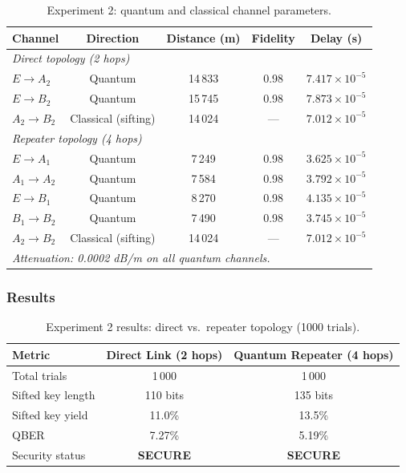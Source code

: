 \documentclass[12pt,oneside,letterpaper,english]{article}
\begin{document}
\begin{table}[h!]
\centering
\caption{Experiment 2: quantum and classical channel parameters.}
\label{tab:exp2_channels}
\begin{tabular}{lcccc}
\toprule
\textbf{Channel} & \textbf{Direction} & \textbf{Distance (m)} & \textbf{Fidelity} & \textbf{Delay (s)} \\
\midrule
\multicolumn{5}{l}{\textit{Direct topology (2 hops)}} \\
\midrule
$E \to A_2$ & Quantum & 14\,833 & 0.98 & $7.417 \times 10^{-5}$ \\
$E \to B_2$ & Quantum & 15\,745 & 0.98 & $7.873 \times 10^{-5}$ \\
$A_2 \to B_2$ & Classical (sifting) & 14\,024 & --- & $7.012 \times 10^{-5}$ \\
\midrule
\multicolumn{5}{l}{\textit{Repeater topology (4 hops)}} \\
\midrule
$E \to A_1$ & Quantum & 7\,249 & 0.98 & $3.625 \times 10^{-5}$ \\
$A_1 \to A_2$ & Quantum & 7\,584 & 0.98 & $3.792 \times 10^{-5}$ \\
$E \to B_1$ & Quantum & 8\,270 & 0.98 & $4.135 \times 10^{-5}$ \\
$B_1 \to B_2$ & Quantum & 7\,490 & 0.98 & $3.745 \times 10^{-5}$ \\
$A_2 \to B_2$ & Classical (sifting) & 14\,024 & --- & $7.012 \times 10^{-5}$ \\
\midrule
\multicolumn{5}{l}{\textit{Attenuation: 0.0002 dB/m on all quantum channels.}} \\
\bottomrule
\end{tabular}
\end{table}

\subsubsection{Results}

\begin{table}[h!]
\centering
\caption{Experiment 2 results: direct vs.\ repeater topology (1000 trials).}
\label{tab:exp2_results}
\begin{tabular}{lcc}
\toprule
\textbf{Metric} & \textbf{Direct Link (2 hops)} & \textbf{Quantum Repeater (4 hops)} \\
\midrule
Total trials & 1\,000 & 1\,000 \\
Sifted key length & 110 bits & 135 bits \\
Sifted key yield & 11.0\% & 13.5\% \\
QBER & 7.27\% & 5.19\% \\
Security status & \textbf{SECURE} & \textbf{SECURE} \\
\bottomrule
\end{tabular}
\end{table}
\end{document}
